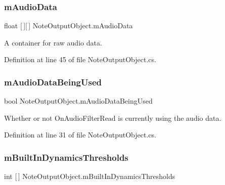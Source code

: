 \subsubsection{\texorpdfstring{m\+Audio\+Data}{mAudioData}}
{\footnotesize\ttfamily float \mbox{[}$\,$\mbox{]}\mbox{[}$\,$\mbox{]} Note\+Output\+Object.\+m\+Audio\+Data\hspace{0.3cm}{\ttfamily [private]}}



A container for raw audio data. 



Definition at line 45 of file Note\+Output\+Object.\+cs.

\mbox{\label{group___n_o_o_priv_var_ga1efa96121f085b27c7d9e8725f90a336}} 
\subsubsection{\texorpdfstring{m\+Audio\+Data\+Being\+Used}{mAudioDataBeingUsed}}
{\footnotesize\ttfamily bool Note\+Output\+Object.\+m\+Audio\+Data\+Being\+Used\hspace{0.3cm}{\ttfamily [private]}}



Whether or not On\+Audio\+Filter\+Read is currently using the audio data. 



Definition at line 31 of file Note\+Output\+Object.\+cs.

\mbox{\label{group___n_o_o_priv_var_ga6a530f5e624caf8087c636df98d7f0b0}} 
\subsubsection{\texorpdfstring{m\+Built\+In\+Dynamics\+Thresholds}{mBuiltInDynamicsThresholds}}
{\footnotesize\ttfamily int \mbox{[}$\,$\mbox{]} Note\+Output\+Object.\+m\+Built\+In\+Dynamics\+Thresholds\hspace{0.3cm}{\ttfamily [private]}}



